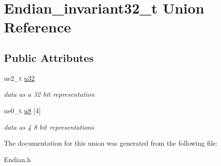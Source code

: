 \hypertarget{union_endian__invariant32__t}{}\section{Endian\+\_\+invariant32\+\_\+t Union Reference}
\label{union_endian__invariant32__t}
\subsection*{Public Attributes}
\begin{DoxyCompactItemize}
\item 
ue2\+\_\+t \hyperlink{union_endian__invariant32__t_a784127cdb901408682dac3f36808845a}{u32}\hypertarget{union_endian__invariant32__t_a784127cdb901408682dac3f36808845a}{}\label{union_endian__invariant32__t_a784127cdb901408682dac3f36808845a}

\begin{DoxyCompactList}\small\item\em data as a 32 bit representation \end{DoxyCompactList}\item 
ue0\+\_\+t \hyperlink{union_endian__invariant32__t_ada459fdec7e2170806c48997490870ad}{u8} \mbox{[}4\mbox{]}\hypertarget{union_endian__invariant32__t_ada459fdec7e2170806c48997490870ad}{}\label{union_endian__invariant32__t_ada459fdec7e2170806c48997490870ad}

\begin{DoxyCompactList}\small\item\em data as 4 8 bit representations \end{DoxyCompactList}\end{DoxyCompactItemize}


The documentation for this union was generated from the following file\+:\begin{DoxyCompactItemize}
\item 
Endian.\+h\end{DoxyCompactItemize}
